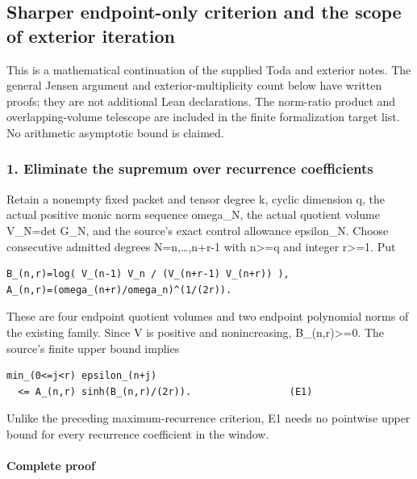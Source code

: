 \subsection{Sharper endpoint-only criterion and the scope of exterior iteration}\label{endpoint-pr23_original--sharper-endpoint-only-criterion-and-the-scope-of-exterior-iteration}

This is a mathematical continuation of the supplied Toda and exterior notes. The general Jensen argument and exterior-multiplicity count below have written proofs; they are not additional Lean declarations. The norm-ratio product and overlapping-volume telescope are included in the finite formalization target list. No arithmetic asymptotic bound is claimed.

\subsubsection{1. Eliminate the supremum over recurrence coefficients}\label{endpoint-pr23_original--eliminate-the-supremum-over-recurrence-coefficients}

Retain a nonempty fixed packet and tensor degree k, cyclic dimension q, the actual positive monic norm sequence omega\_N, the actual quotient volume V\_N=det G\_N, and the source's exact control allowance epsilon\_N. Choose consecutive admitted degrees N=n,\ldots,n+r-1 with n\textgreater=q and integer r\textgreater=1. Put

\begin{verbatim}
B_(n,r)=log( V_(n-1) V_n / (V_(n+r-1) V_(n+r)) ),
A_(n,r)=(omega_(n+r)/omega_n)^(1/(2r)).
\end{verbatim}

These are four endpoint quotient volumes and two endpoint polynomial norms of the existing family. Since V is positive and nonincreasing, B\_(n,r)\textgreater=0. The source's finite upper bound implies

\begin{verbatim}
min_(0<=j<r) epsilon_(n+j)
  <= A_(n,r) sinh(B_(n,r)/(2r)).                 (E1)
\end{verbatim}

Unlike the preceding maximum-recurrence criterion, E1 needs no pointwise upper bound for every recurrence coefficient in the window.

\paragraph{Complete proof}\label{endpoint-pr23_original--complete-proof}

